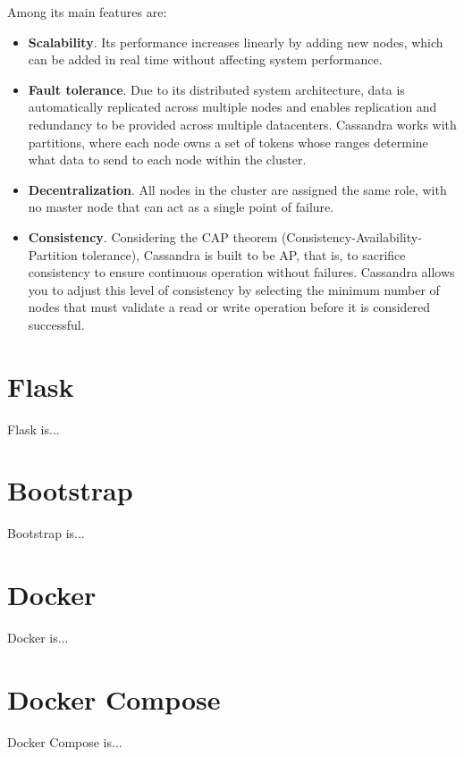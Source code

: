 \nonzeroparskip Among its main features are:
\begin{itemize}
	\item \textbf{Scalability}. Its performance increases linearly by adding new nodes, which can be added in real time without affecting system performance.
	\item \textbf{Fault tolerance}. Due to its distributed system architecture, data is automatically replicated across multiple nodes and enables replication and redundancy to be provided across multiple datacenters. Cassandra works with partitions, where each node owns a set of tokens whose ranges determine what data to send to each node within the cluster.
	\item \textbf{Decentralization}. All nodes in the cluster are assigned the same role, with no master node that can act as a single point of failure.
	\item \textbf{Consistency}. Considering the CAP theorem (Consistency-Availability-Partition tolerance), Cassandra is built to be AP, that is, to sacrifice consistency to ensure continuous operation without failures. Cassandra allows you to adjust this level of consistency by selecting the minimum number of nodes that must validate a read or write operation before it is considered successful.
\end{itemize}

\section{Flask}

\nonzeroparskip Flask is...

\section{Bootstrap}

\nonzeroparskip Bootstrap is...

\section{Docker}

\nonzeroparskip Docker is...

\section{Docker Compose}

\nonzeroparskip Docker Compose is...
